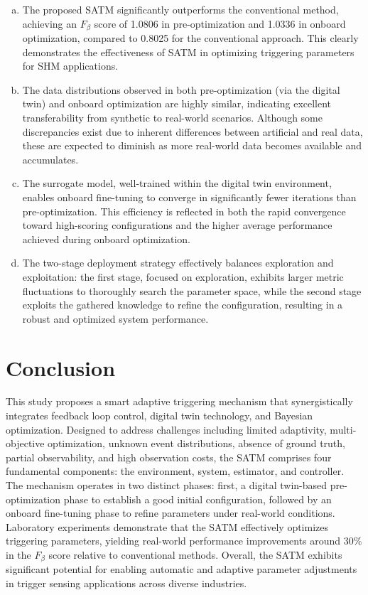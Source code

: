 \documentclass[a4paper,fleqn,numbers,sort&compress]{cas-sc}
\begin{document}
\begin{enumerate}[a)]
    \item The proposed SATM significantly outperforms the conventional method, achieving an \(F_{\beta}\) score of 1.0806 in pre-optimization and 1.0336 in onboard optimization, compared to 0.8025 for the conventional approach. This clearly demonstrates the effectiveness of SATM in optimizing triggering parameters for SHM applications.
    \item The data distributions observed in both pre-optimization (via the digital twin) and onboard optimization are highly similar, indicating excellent transferability from synthetic to real-world scenarios. Although some discrepancies exist due to inherent differences between artificial and real data, these are expected to diminish as more real-world data becomes available and accumulates.
    \item The surrogate model, well-trained within the digital twin environment, enables onboard fine-tuning to converge in significantly fewer iterations than pre-optimization. This efficiency is reflected in both the rapid convergence toward high-scoring configurations and the higher average performance achieved during onboard optimization.
    \item The two-stage deployment strategy effectively balances exploration and exploitation: the first stage, focused on exploration, exhibits larger metric fluctuations to thoroughly search the parameter space, while the second stage exploits the gathered knowledge to refine the configuration, resulting in a robust and optimized system performance.
\end{enumerate}

\section{Conclusion}
\label{sec:conclusion}

This study proposes a smart adaptive triggering mechanism that synergistically integrates feedback loop control, digital twin technology, and Bayesian optimization. Designed to address challenges including limited adaptivity, multi-objective optimization, unknown event distributions, absence of ground truth, partial observability, and high observation costs, the SATM comprises four fundamental components: the environment, system, estimator, and controller. The mechanism operates in two distinct phases: first, a digital twin-based pre-optimization phase to establish a good initial configuration, followed by an onboard fine-tuning phase to refine parameters under real-world conditions. Laboratory experiments demonstrate that the SATM effectively optimizes triggering parameters, yielding real-world performance improvements around 30\% in the \(F_{\beta}\) score relative to conventional methods. Overall, the SATM exhibits significant potential for enabling automatic and adaptive parameter adjustments in trigger sensing applications across diverse industries.
\end{document}
